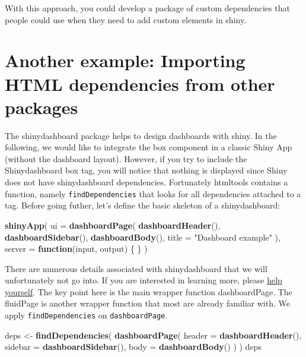\documentclass[
]{book}
\newenvironment{Shaded}{\begin{snugshade}}{\end{snugshade}}
\newcommand{\ControlFlowTok}[1]{\textcolor[rgb]{0.13,0.29,0.53}{\textbf{#1}}}
\newcommand{\DataTypeTok}[1]{\textcolor[rgb]{0.13,0.29,0.53}{#1}}
\newcommand{\KeywordTok}[1]{\textcolor[rgb]{0.13,0.29,0.53}{\textbf{#1}}}
\newcommand{\NormalTok}[1]{#1}
\newcommand{\StringTok}[1]{\textcolor[rgb]{0.31,0.60,0.02}{#1}}
\begin{document}
With this approach, you could develop a package of custom dependencies that people
could use when they need to add custom elements in shiny.

\hypertarget{another-example-importing-html-dependencies-from-other-packages}{%
\section{Another example: Importing HTML dependencies from other packages}\label{another-example-importing-html-dependencies-from-other-packages}}

The shinydashboard package helps to design dashboards with shiny. In the following, we would like to integrate the box component in a classic Shiny App (without the dashboard layout). However, if you try to include the Shinydashboard box tag, you will notice that nothing is displayed since Shiny does not have shinydashboard dependencies. Fortunately htmltools contains a function, namely \texttt{findDependencies} that looks for all dependencies attached to a tag. Before going futher, let's define the basic skeleton of a shinydashboard:

\begin{Shaded}
\begin{Highlighting}[]
\KeywordTok{shinyApp}\NormalTok{(}
  \DataTypeTok{ui =} \KeywordTok{dashboardPage}\NormalTok{(}
    \KeywordTok{dashboardHeader}\NormalTok{(),}
    \KeywordTok{dashboardSidebar}\NormalTok{(),}
    \KeywordTok{dashboardBody}\NormalTok{(),}
    \DataTypeTok{title =} \StringTok{"Dashboard example"}
\NormalTok{  ),}
  \DataTypeTok{server =} \ControlFlowTok{function}\NormalTok{(input, output) \{ \}}
\NormalTok{)}
\end{Highlighting}
\end{Shaded}

There are numerous details associated with shinydashboard that we will unfortunately not go into. If you are interested in learning more, please \href{https://rstudio.github.io/shinydashboard/}{help yourself}. The key point here is the main wrapper function dashboardPage. The fluidPage is another wrapper function that most are already familiar with. We apply \texttt{findDependencies} on \texttt{dashboardPage}.

\begin{Shaded}
\begin{Highlighting}[]
\NormalTok{deps <-}\StringTok{ }\KeywordTok{findDependencies}\NormalTok{(}
  \KeywordTok{dashboardPage}\NormalTok{(}
    \DataTypeTok{header =} \KeywordTok{dashboardHeader}\NormalTok{(), }
    \DataTypeTok{sidebar =} \KeywordTok{dashboardSidebar}\NormalTok{(), }
    \DataTypeTok{body =} \KeywordTok{dashboardBody}\NormalTok{()}
\NormalTok{  )}
\NormalTok{)}
\NormalTok{deps}
\end{Highlighting}
\end{Shaded}
\end{document}
